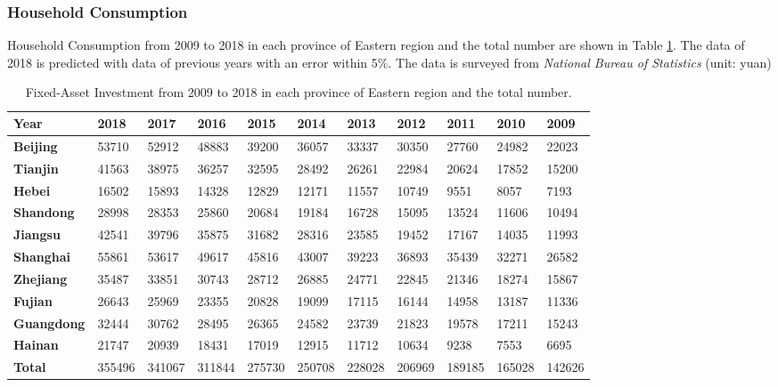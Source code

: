 \documentclass{apmcmthesis}
\begin{document}
\subsubsection{Household Consumption}
\hspace{2em}Household Consumption from 2009 to 2018 in each province of Eastern region and the total number are shown in Table \ref{tabel7}. The data of 2018 is predicted with data of previous years with an error within 5\%. The data is surveyed from \textit{National Bureau of Statistics} (unit: yuan)
\begin{table}[h]
\scriptsize
\centering
\caption{Fixed-Asset Investment from 2009 to 2018 in each province of Eastern region and the total number.} 
\begin{tabular}{p{1cm}<{\centering}p{1cm}<{\centering}p{1cm}<{\centering}p{1cm}<{\centering}p{1cm}<{\centering}p{1cm}<{\centering}p{1cm}<{\centering}p{1cm}<{\centering}p{1cm}<{\centering}p{1cm}<{\centering}p{1cm}<{\centering}}
\toprule
  \textbf{Year} &\textbf{2018} & \textbf{2017} & \textbf{2016} & \textbf{2015} & \textbf{2014} & \textbf{2013} & \textbf{2012} & \textbf{2011} & \textbf{2010} & \textbf{2009}  \\
\midrule
   \textbf{Beijing} & 53710  & 52912  & 48883  & 39200  & 36057  & 33337  & 30350  & 27760  & 24982  & 22023 \\
   \textbf{Tianjin} & 41563  & 38975  & 36257  & 32595  & 28492  & 26261  & 22984  & 20624  & 17852  & 15200 \\
   \textbf{Hebei}   & 16502  & 15893  & 14328  & 12829  & 12171  & 11557  & 10749  & 9551  & 8057  & 7193   \\
   \textbf{Shandong}& 28998  & 28353  & 25860  & 20684  & 19184  & 16728  & 15095  & 13524  & 11606  & 10494 \\
   \textbf{Jiangsu} & 42541  & 39796  & 35875  & 31682  & 28316  & 23585  & 19452  & 17167  & 14035  & 11993    \\
   \textbf{Shanghai}& 55861  & 53617  & 49617  & 45816  & 43007  & 39223  & 36893  & 35439  & 32271  & 26582 \\
   \textbf{Zhejiang}& 35487  & 33851  & 30743  & 28712  & 26885  & 24771  & 22845  & 21346  & 18274  & 15867  \\
   \textbf{Fujian}  & 26643  & 25969  & 23355  & 20828  & 19099  & 17115  & 16144  & 14958  & 13187  & 11336   \\
   \textbf{Guangdong}& 32444  & 30762  & 28495  & 26365  & 24582  & 23739  & 21823  & 19578  & 17211  & 15243   \\
   \textbf{Hainan}  & 21747  & 20939  & 18431  & 17019  & 12915  & 11712  & 10634  & 9238  & 7553  & 6695  \\
   \textbf{Total} & 355496  & 341067  & 311844  & 275730  & 250708  & 228028  & 206969  & 189185  & 165028  & 142626\\
\bottomrule
\end{tabular}\label{tabel7}
\end{table}
\end{document}
